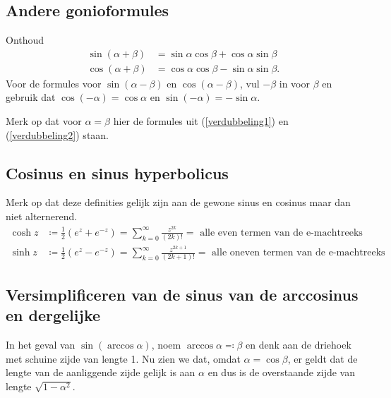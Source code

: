 \subsection{Andere gonioformules}

Onthoud
\begin{align*}
    \sin(\alpha + \beta) &= \sin \alpha \cos \beta + \cos \alpha \sin \beta \\
    \cos(\alpha + \beta) &= \cos \alpha \cos \beta - \sin \alpha \sin \beta .
\end{align*}
Voor de formules voor $\sin(\alpha - \beta)$ en $\cos(\alpha - \beta)$, vul $-\beta$ in voor $\beta$ en gebruik dat $\cos (-\alpha) = \cos \alpha $ en $\sin (-\alpha) = - \sin \alpha $.

Merk op dat voor $\alpha = \beta$ hier de formules uit (\ref{verdubbeling1}) en (\ref{verdubbeling2}) staan.



\subsection{Cosinus en sinus hyperbolicus}\label{subsec:cosinusEnSinusHyperbolicus}

Merk op dat deze definities gelijk zijn aan de gewone sinus en cosinus maar dan niet alternerend.
\begin{align*}
    \cosh z &\coloneqq \frac{1}{2} (e^z + e^{-z}) = \sum_{k=0}^\infty \frac{z^{2k}}{(2k)!} = \text{ alle even termen van de e-machtreeks} \\
    \sinh z &\coloneqq \frac{1}{2} (e^z - e^{-z}) = \sum_{k=0}^\infty \frac{z^{2k+1}}{(2k+1)!} = \text{ alle oneven termen van de e-machtreeks}
\end{align*}

\subsection{Versimplificeren van de sinus van de arccosinus en dergelijke}\label{subsec:versimplificerenVanDeSinusVanDeArccosinusEnDergelijke}

In het geval van $\sin (\arccos \alpha)$, noem $\arccos \alpha \eqqcolon \beta$ en denk aan de driehoek met schuine zijde van lengte 1.
Nu zien we dat, omdat $\alpha = \cos \beta$, er geldt dat de lengte van de aanliggende zijde gelijk is aan $\alpha$ en dus is de overstaande zijde van lengte $\sqrt{1-\alpha^2}$.


